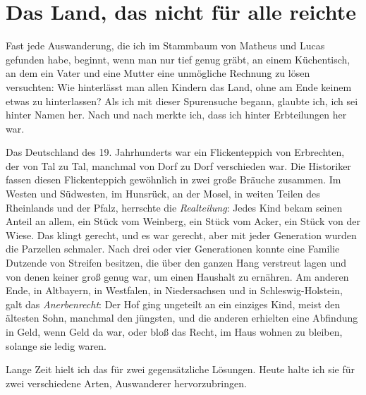 \documentclass[
  ngerman,
  11pt,
  openany]{book}
\begin{document}
\section{Das Land, das nicht für alle
reichte}\label{das-land-das-nicht-fuxfcr-alle-reichte}

Fast jede Auswanderung, die ich im Stammbaum von Matheus und Lucas
gefunden habe, beginnt, wenn man nur tief genug gräbt, an einem
Küchentisch, an dem ein Vater und eine Mutter eine unmögliche Rechnung
zu lösen versuchten: Wie hinterlässt man allen Kindern das Land, ohne am
Ende keinem etwas zu hinterlassen? Als ich mit dieser Spurensuche
begann, glaubte ich, ich sei hinter Namen her. Nach und nach merkte ich,
dass ich hinter Erbteilungen her war.

Das Deutschland des 19. Jahrhunderts war ein Flickenteppich von
Erbrechten, der von Tal zu Tal, manchmal von Dorf zu Dorf verschieden
war. Die Historiker fassen diesen Flickenteppich gewöhnlich in zwei
große Bräuche zusammen. Im Westen und Südwesten, im Hunsrück, an der
Mosel, in weiten Teilen des Rheinlands und der Pfalz, herrschte die
\emph{Realteilung}: Jedes Kind bekam seinen Anteil an allem, ein Stück
vom Weinberg, ein Stück vom Acker, ein Stück von der Wiese. Das klingt
gerecht, und es war gerecht, aber mit jeder Generation wurden die
Parzellen schmaler. Nach drei oder vier Generationen konnte eine Familie
Dutzende von Streifen besitzen, die über den ganzen Hang verstreut lagen
und von denen keiner groß genug war, um einen Haushalt zu ernähren. Am
anderen Ende, in Altbayern, in Westfalen, in Niedersachsen und in
Schleswig-Holstein, galt das \emph{Anerbenrecht}: Der Hof ging ungeteilt
an ein einziges Kind, meist den ältesten Sohn, manchmal den jüngsten,
und die anderen erhielten eine Abfindung in Geld, wenn Geld da war, oder
bloß das Recht, im Haus wohnen zu bleiben, solange sie ledig waren.

Lange Zeit hielt ich das für zwei gegensätzliche Lösungen. Heute halte
ich sie für zwei verschiedene Arten, Auswanderer hervorzubringen.
\end{document}
